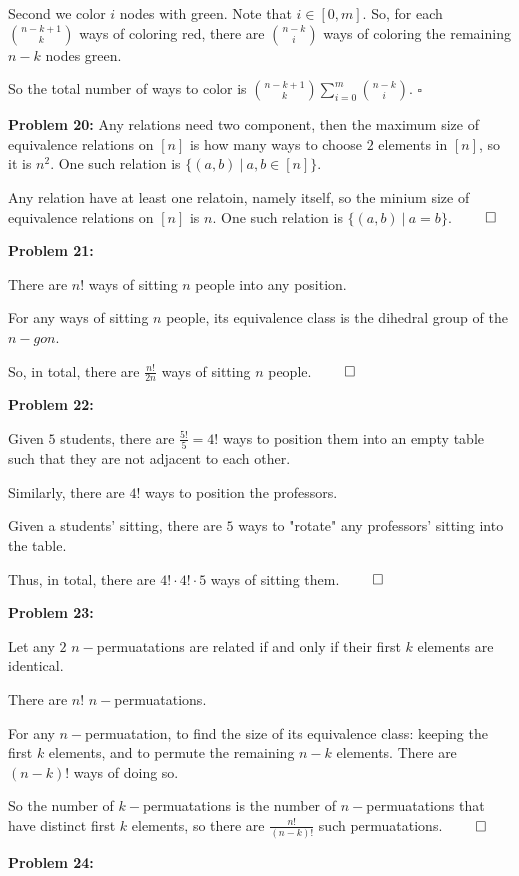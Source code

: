 \documentclass[12pt]{article}
\newcommand{\prob}[1]{\textbf{Problem #1:}}
\begin{document}
Second we color $i$ nodes with green. Note that $i \in [0,m]$. So, for each $\binom{n-k+1}{k}$ ways of coloring red, there are $\binom{n-k}{i}$ ways of coloring the remaining $n-k$ nodes green.

So the total number of ways to color is $\binom{n-k+1}{k} \sum\limits^{m}_{i=0}\binom{n-k}{i}$. $\square$

\prob{20} Any relations need two component, then the maximum size of equivalence relations on $[n]$ is how many ways to choose $2$ elements in $[n]$, so it is $n^2$. One such relation is $\{(a,b) ~|~ a,b \in [n]\}$. 

        Any relation have at least one relatoin, namely itself, so the minium size of equivalence relations on $[n]$ is $n$. One such relation is $\{(a, b) ~|~ a = b\}$. $\qed$

\textbf{Problem 21:}

There are $n!$ ways of sitting $n$ people into any position.

For any ways of sitting $n$ people, its equivalence class is the dihedral group of the $n-gon$.

So, in total, there are $\frac{n!}{2n}$ ways of sitting $n$ people. $\qed$

\textbf{Problem 22:}

Given $5$ students, there are $\frac{5!}{5} = 4!$ ways to position them into an empty table such that they are not adjacent to each other.

Similarly, there are $4!$ ways to position the professors.

Given a students' sitting, there are $5$ ways to "rotate" any professors' sitting into the table.

Thus, in total, there are $4! \cdot 4! \cdot 5$ ways of sitting them. $\qed$

\textbf{Problem 23:}

Let any $2$ $n-$permuatations are related if and only if their first $k$ elements are identical.

There are $n!$ $n-$permuatations.

For any $n-$permuatation, to find the size of its equivalence class: keeping the first $k$ elements, and to permute the remaining $n-k$ elements. There are $(n-k)!$ ways of doing so.

So the number of $k-$permuatations is the number of $n-$permuatations that have distinct first $k$ elements, so there are $\frac{n!}{(n-k)!}$ such permuatations. $\qed$

\textbf{Problem 24:}
\end{document}
